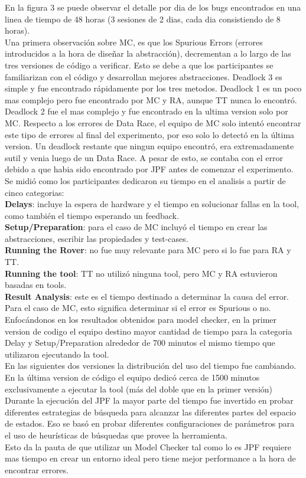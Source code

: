 \documentclass[runningheads]{llncs}
\begin{document}
En la figura 3 se puede observar el detalle por dia de los bugs encontrados en una linea de tiempo de 48 horas (3 sesiones de 2 dias, cada dia consistiendo de 8 horas).\\ Una primera observaci\'on sobre MC, es que los Spurious Errors (errores introducidos a la hora de dise\~nar la abstracci\'on), decrementan a lo largo de las tres versiones de c\'odigo a verificar. Esto se debe a que los participantes se familiarizan con el c\'odigo y desarrollan mejores abstracciones. Deadlock 3 es simple y fue encontrado r\'apidamente por los tres metodos. Deadlock 1 es un poco mas complejo pero fue encontrado por MC y RA, aunque TT nunca lo encontr\'o. Deadlock 2 fue el mas complejo y fue encontrado en la ultima version solo por MC. Respecto a los errores de Data Race, el equipo de MC solo intent\'o encontrar este tipo de errores al final del experimento, por eso solo lo detect\'o en la \'ultima version. Un deadlock restante que ningun equipo encontr\'o, era extremadamente sutil y venia luego de un Data Race. A pesar de esto, se contaba con el error debido a que habia sido encontrado por JPF antes de comenzar el experimento.\\
Se midi\'o como los participantes dedicaron su tiempo en el analisis a partir de cinco categorias:\\
\textbf{Delays}: incluye la espera de hardware y el tiempo en solucionar fallas en la tool, como tambi\'en el tiempo esperando un feedback.\\
\textbf{Setup/Preparation}: para el caso de MC incluy\'o el tiempo en crear las abstracciones, escribir las propiedades y test-cases.\\
\textbf{Running the Rover}: no fue muy relevante para MC pero si lo fue para RA y TT.\\
\textbf{Running the tool}: TT no utiliz\'o ninguna tool, pero MC y RA estuvieron basadas en tools.\\
\textbf{Result Analysis}: este es el tiempo destinado a determinar la causa del error. Para el caso de MC, esto significa determinar si el error es Spurious o no.\\
Enfoc\'andonos en los resultados obtenidos para model checker,  en la primer version de codigo el equipo destino mayor cantidad de tiempo para la categoria Delay y Setup/Preparation alrededor de 700 minutos el mismo tiempo que utilizaron ejecutando la tool.\\
En las siguientes dos versiones la distribuci\'on del uso del tiempo fue cambiando. En la \'ultima version de c\'odigo el equipo dedic\'o cerca de 1500 minutos exclusivamente a ejecutar la tool (m\'as del doble que en la primer versi\'on)
Durante la ejecuci\'on del JPF la mayor parte del tiempo fue invertido en probar diferentes estrategias de b\'usqueda para alcanzar las diferentes partes del espacio de estados. Eso se bas\'o en probar diferentes configuraciones de par\'ametros para el uso de heur\'isticas de b\'usquedas que provee la herramienta.\\
Esto da la pauta de que utilizar un Model Checker tal como lo es JPF requiere mas tiempo en crear un entorno ideal pero tiene mejor performance a la hora de encontrar errores.
\end{document}
